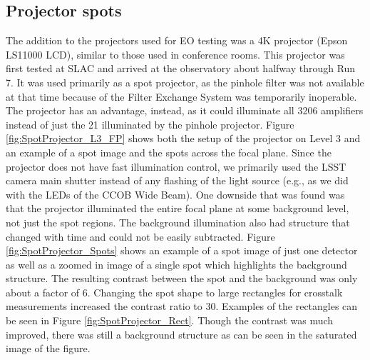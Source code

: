 \subsection{Projector spots}\label{projector-spots}
The addition to the projectors used for EO testing was a 4K
projector (Epson LS11000 LCD), similar to those used in conference rooms. This projector was
first tested at SLAC and arrived at the observatory about halfway through Run 7.
It was used primarily as a spot projector, as the pinhole filter
was not available at that time because of the Filter Exchange System was temporarily inoperable. The projector has an advantage, instead, as it could
illuminate all 3206 amplifiers instead of just the 21 illuminated by the
pinhole projector. Figure \ref{fig:SpotProjector_L3_FP} shows both the setup of the projector on Level 3 and an example of a spot image and the spots across the focal plane. Since the projector does not have fast illumination control, we primarily used the LSST camera main shutter instead of any flashing of the light source (e.g., as we did with the LEDs of the CCOB Wide Beam). One
downside that was found was that the projector illuminated the entire focal plane at some background level, not just the spot regions. The background illumination also had
structure that changed with time and could not be easily subtracted. Figure \ref{fig:SpotProjector_Spots} shows an example of a spot image of just one detector as well as a zoomed in image of a single spot which highlights the background structure. The resulting contrast between the spot and the background was only about a factor of 6. Changing the spot shape to large rectangles for crosstalk
measurements increased the contrast ratio to 30. Examples of the rectangles can be seen in Figure \ref{fig:SpotProjector_Rect}. Though the contrast was much improved, there was still a background structure as can be seen in the saturated image of the figure.

